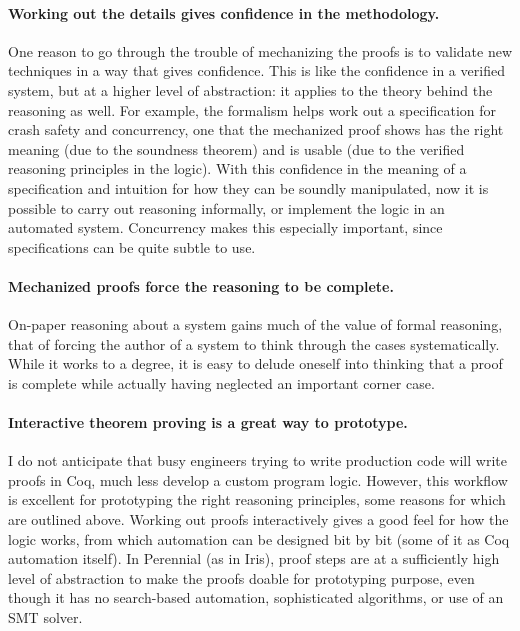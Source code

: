 \paragraph{Working out the details gives confidence in the methodology.} One
reason to go through the trouble of mechanizing the proofs is to validate new
techniques in a way that gives confidence. This is like the confidence in a
verified system, but at a higher level of abstraction: it applies to the theory
behind the reasoning as well.  For example, the formalism helps
work out a specification for crash safety and concurrency, one that the
mechanized proof shows has the right meaning (due to the soundness theorem) and
is usable (due to the verified reasoning principles in the logic). With this
confidence in the meaning of a specification and intuition for how they can be
soundly manipulated, now it is possible to carry out reasoning informally, or
implement the logic in an automated system. Concurrency makes this especially
important, since specifications can be quite subtle to use. 

\paragraph{Mechanized proofs force the reasoning to be complete.} On-paper
reasoning about a system gains much of the value of formal reasoning, that of
forcing the author of a system to think through the cases systematically. While
it works to a degree, it is easy to delude oneself into thinking that a proof is
complete while actually having neglected an important corner case.

\paragraph{Interactive theorem proving is a great way to prototype.} I do not
anticipate that busy engineers trying to write production code will write proofs
in Coq, much less develop a custom program logic. However, this workflow is
excellent for prototyping the right reasoning principles, some reasons for which
are outlined above. Working out proofs interactively gives a good feel for how
the logic works, from which automation can be designed bit by bit (some of it as
Coq automation itself). In Perennial (as in Iris), proof steps are at a
sufficiently high level of abstraction to make the proofs doable for prototyping
purpose, even though it has no search-based automation, sophisticated
algorithms, or use of an SMT solver.

